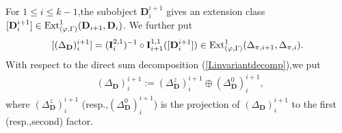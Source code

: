 \documentclass[SecEq,CM,GP]{degruyter-crelle} %
\theoremstyle{plain}
\newcommand{\Dpik}{{\mathbf{D}}}
\newcommand{\ext}{{\rm Ext}}
\newcommand{\padelc}{{(\Delta_{\Dpik}^z)}}
\newcommand{\padel}{{(\Delta_{\Dpik}^0)}}
\begin{document}
For $1\leq i\leq k-1$,\;the subobject $\Dpik^{i+1}_{i}$ gives an extension class $[\Dpik^{i+1}_{i}]\in \ext^1_{(\varphi,\Gamma)}(\Dpik_{i+1},\Dpik_{i})$. We further put $$[({\Delta_{\Dpik}})^{i+1}_{i}]=({\mathbf{I}}_{i}^{2,1})^{-1}\circ {\mathbf{I}}_{i+1}^{1,1}([\Dpik^{i+1}_{i}])\in \ext^1_{(\varphi,\Gamma)}(\Delta_{\pi,i+1},\Delta_{\pi,i}).$$
With respect to the  direct sum decomposition (\ref{Linvariantdecomp}),\;we put 
\begin{equation}\label{c0extensions}
\begin{aligned}
	&({\Delta_{\Dpik}})^{i+1}_{i}:=\padelc^{i+1}_{i}\oplus \padel^{i+1}_{i},\;
\end{aligned}
\end{equation}
where $\padelc^{i+1}_{i}$ (resp.,\;$\padel^{i+1}_{i}$) is the projection of $({\Delta_{\Dpik}})^{i+1}_{i}$ to the first (resp.,\;second) factor.\;
\end{document}
